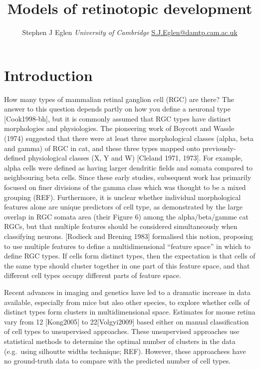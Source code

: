 \documentclass[11pt,article,oneside]{memoir}
\title{\bigskip \bigskip Models of retinotopic development}
\author{\Large Stephen J Eglen\vspace{0.05in} \newline\normalsize\emph{University of Cambridge} \newline\footnotesize \url{S.J.Eglen@damtp.cam.ac.uk}\vspace*{0.2in}\newline }
\date{}
\begin{document}
  
\pagestyle{kjh}


\maketitle



\section{Introduction}\label{introduction}

How many types of mammalian retinal ganglion cell (RGC) are there? The
answer to this question depends partly on how you define a neuronal type
{[}Cook1998-bh{]}, but it is commonly assumed that RGC types have
distinct morphologies and physiologies. The pioneering work of Boycott
and Wassle (1974) suggested that there were at least three morphological
classes (alpha, beta and gamma) of RGC in cat, and these three types
mapped onto previously-defined physiological classes (X, Y and W)
{[}Cleland 1971, 1973{]}. For example, alpha cells were defined as
having larger dendritic fields and somata compared to neighbouring beta
cells. Since these early studies, subsequent work has primarily focused
on finer divisions of the gamma class which was thought to be a mixed
grouping (REF). Furthermore, it is unclear whether individual
morphological features alone are unique predictors of cell type, as
demonstrated by the large overlap in RGC somata area (their Figure 6)
among the alpha/beta/gamme cat RGCs, but that multiple features should
be considered simultaneously when classifying neurons. {[}Rodieck and
Brening 1983{]} formalised this notion, proposing to use multiple
features to define a multidimensional ``feature space'' in which to
define RGC types. If cells form distinct types, then the expectation is
that cells of the same type should cluster together in one part of this
feature space, and that different cell types occupy different parts of
feature space.

Recent advances in imaging and genetics have led to a dramatic increase
in data available, especially from mice but also other species, to
explore whether cells of distinct types form clusters in
multidimensional space. Estimates for mouse retina vary from 12
{[}Kong2005{]} to 22{[}Volgyi2009{]} based either on manual
classification of cell types to unsupervised approaches. These
unsupervised approaches use statistical methods to determine the optimal
number of clusters in the data (e.g.~using silhoutte widths technique;
REF). However, these approachees have no ground-truth data to compare
with the predicted number of cell types.
\end{document}
